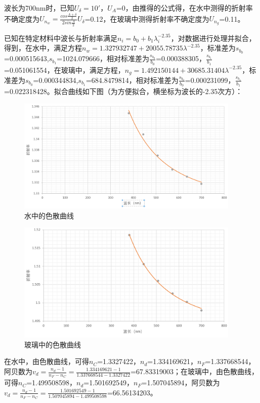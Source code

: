 \documentclass[UTF8]{ctexart}
\begin{document}
波长为700nm时，已知$U_\delta=10'$，$U_A$=0，由推得的公式得，在水中测得的折射率不确定度为$U_{n_w}=\frac{cos\frac{A+\delta}{2}}{2sin\frac{A}{2}}U_\delta$=0.12，在玻璃中测得折射率不确定度为$U_{n_g}$=0.11。

已知在特定材料中波长与折射率满足$n_i=b_0+b_1\lambda_i^{-2.35}$，对数据进行处理并拟合，得到，在水中，满足方程$n_w=1.327932747+20055.78735\lambda^{-2.35}$，标准差为$s_{b_0}$=0.000515643,$s_{b_1}$=1024.079666，相对标准差为$\frac{s_{b_0}}{b_0}$=0.000388305，$\frac{s_{b_1}}{b_1}$=0.051061554，在玻璃中，满足方程，$n_g=1.492150144+30685.31404\lambda^{-2.35}$，标准差为$s_{b_0}$=0.000344834,$s_{b_1}$=684.8479814，相对标准差为$\frac{s_{b_0}}{b_0}$=0.000231099，$\frac{s_{b_1}}{b_1}$=0.022318428。拟合曲线如下图（为方便拟合，横坐标为波长的-2.35次方）：
\begin{figure} [h]
\centering
\includegraphics[width=0.95\textwidth]{C.png} 
\caption{水中的色散曲线}
\end{figure}
\begin{figure}[h] 
\centering
\includegraphics[width=0.95\textwidth]{D.png} 
\caption{玻璃中的色散曲线}
\end{figure}
\newpage
在水中，由色散曲线，可得$n_C$=1.3327422，$n_d$=1.334169621，$n_F$=1.337668544，阿贝数为$v_d=\frac{n_d-1}{n_F-n_C}=\frac{1.334169621-1}{1.337668544-1.3327422}$=67.83319003；在玻璃中，由色散曲线，可得$n_C$=1.499508598，$n_d$=1.501692549，$n_F$=1.507045894，阿贝数为$v_d=\frac{n_d-1}{n_F-n_C}=\frac{1.501692549-1}{1.507045894-1.499508598}$=66.56134203。
\end{document}
